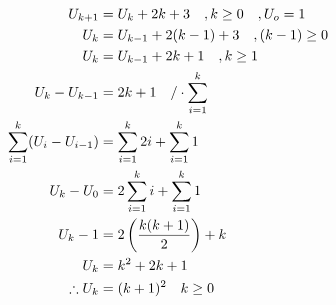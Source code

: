 \begin{align*}
    U_{k+1} &= U_k + 2k + 3 \quad ,k \ge 0 \quad ,U_o=1 \\
    U_k &= U_{k-1} + 2(k-1) + 3 \quad ,(k-1) \ge 0\\
    U_k &= U_{k-1} + 2k + 1 \quad ,k \ge 1\\
    U_k - U_{k-1} &=  2k + 1\quad \text{/}\cdot\sum\limits_{i=1}^{k}\\
    \sum\limits_{i=1}^{k}(U_i - U_{i-1}) &= \sum\limits_{i=1}^{k} 2i +\sum\limits_{i=1}^{k} 1 \\
    U_k - U_0 &= 2\sum\limits_{i=1}^{k}i + \sum\limits_{i=1}^{k}1\\
    U_k - 1 &= 2 \left( \frac{k(k+1)}{2} \right) + k \\
    U_k &= k^2 +2k + 1 \\
    \therefore U_k &= (k+1)^2 \quad k \ge 0
\end{align*}